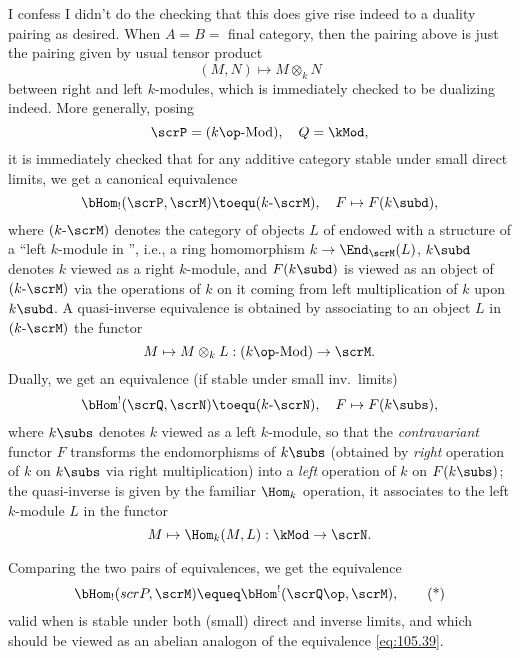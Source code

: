I confess I didn't do the checking that this does give rise indeed to
a duality pairing as desired. When $A=B=$ final category, then the
pairing above is just the pairing given by usual tensor product
\[(M,N)\mapsto M\otimes_k N\]
between right and left $k$-modules, which is immediately checked to be
dualizing indeed. More generally, posing
\[\scrP=(k\op\textup{-Mod}),\quad Q=\kMod,\]
it is immediately checked that for any additive category \scrM{}
stable under small direct limits, we get a canonical
equivalence
\[\bHom_!(\scrP,\scrM) \toequ (k\textup{-}\scrM), \quad
F\mapsto F(k\subd),\]
where $(k\textup{-}\scrM)$ denotes the category of objects $L$ of
\scrM{} endowed with a structure of a ``left $k$-module in \scrM'',
i.e., a ring homomorphism $k\to\End_\scrM(L)$, $k\subd$ denotes $k$
viewed as a right $k$-module, and $F(k\subd)$ is viewed as an object
of $(k\textup{-}\scrM)$ via the operations of $k$ on it coming from
left multiplication of $k$ upon $k\subd$. A quasi-inverse equivalence
is obtained by associating to an object $L$ in $(k\textup{-}\scrM)$
the functor
\[M\mapsto M\otimes_k L: (k\op\textup{-Mod})\to\scrM.\]
Dually, we get an equivalence (if \scrN{} stable under small inv.\
limits)
\[\bHom^!(\scrQ,\scrN) \toequ (k\textup{-}\scrN), \quad
F\mapsto F(k\subs),\]
where $k\subs$ denotes $k$ viewed as a left $k$-module, so that the
\emph{contravariant} functor $F$ transforms the endomorphisms of
$k\subs$ (obtained by \emph{right} operation of $k$ on $k\subs$ via
right multiplication) into a \emph{left} operation of $k$ on
$F(k\subs)$; the quasi-inverse is given by the familiar $\Hom_k$
operation, it associates to the left $k$-module $L$ in \scrM{} the
functor
\[M\mapsto \Hom_k(M,L): \kMod\to\scrN.\]

Comparing the two pairs of equivalences, we get the
equivalence
\begin{equation}
  \label{eq:105.starbis}
  \bHom_!(scrP,\scrM) \equeq \bHom^!(\scrQ\op,\scrM),\tag{*}
\end{equation}
valid when \scrM{} is stable under both (small) direct and inverse
limits, and which should be viewed as an abelian analogon of the
equivalence \eqref{eq:105.39}.

